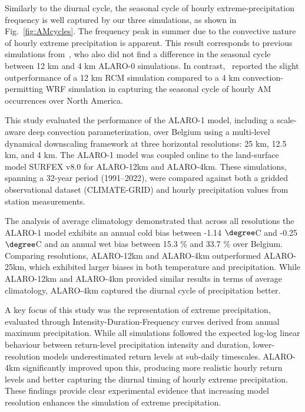 \documentclass[journal abbreviation, manuscript]{copernicus}
\begin{document}
Similarly to the diurnal cycle, the seasonal cycle of hourly extreme-precipitation frequency is well captured by our three simulations, as shown in Fig.~\ref{fig:AMcycles}.
The frequency peak in summer due to the convective nature of hourly extreme precipitation is apparent.
This result corresponds to previous simulations from~\citet{van_de_vyver_evaluation_2021}, who also did not find a difference in the seasonal cycle between 12 km and 4 km ALARO-0 simulations.
In contrast,~\citet{innocenti_observed_2019} reported the slight outperformance of a 12 km RCM simulation compared to a 4 km convection-permitting WRF simulation in capturing the seasonal cycle of hourly AM occurrences over North America.

\conclusions  %
\label{sect:conclusions}


This study evaluated the performance of the ALARO-1 model, including a scale-aware deep convection parameterization, over Belgium using a multi-level dynamical downscaling framework at three horizontal resolutions: 25 km, 12.5 km, and 4 km.
The ALARO-1 model was coupled online to the land-surface model SURFEX v8.0 for ALARO-12km and ALARO-4km.
These simulations, spanning a 32-year period (1991–2022), were compared against both a gridded observational dataset (CLIMATE-GRID) and hourly precipitation values from station measurements.

The analysis of average climatology demonstrated that across all resolutions the ALARO-1 model exhibits an annual cold bias between -1.14 $\degree$C and -0.25 $\degree$C and an annual wet bias between 15.3 \% and 33.7 \% over Belgium.
Comparing resolutions, ALARO-12km and ALARO-4km outperformed ALARO-25km, which exhibited larger biases in both temperature and precipitation.
While ALARO-12km and ALARO-4km provided similar results in terms of average climatology, ALARO-4km captured the diurnal cycle of precipitation better.

A key focus of this study was the representation of extreme precipitation, evaluated through Intensity-Duration-Frequency curves derived from annual maximum precipitation.
While all simulations followed the expected log-log linear behaviour between return-level precipitation intensity and duration, lower-resolution models underestimated return levels at sub-daily timescales.
ALARO-4km significantly improved upon this, producing more realistic hourly return levels and better capturing the diurnal timing of hourly extreme precipitation.
These findings provide clear experimental evidence that increasing model resolution enhances the simulation of extreme precipitation.
\end{document}
